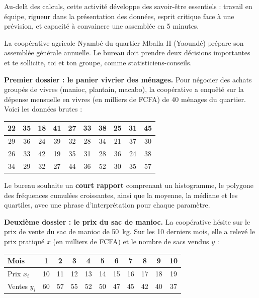 \documentclass[11pt]{article}
\newcounter{popsec}
\newcounter{popsub}
\newcommand{\courssub}[1]{%
  \stepcounter{popsub}%
  \par\vspace{9pt}\noindent{\popxbold\fontsize{11.5}{13}\selectfont\color{popink}{\color{poporange}\thepopsec.\thepopsub}\hspace{6pt}#1}\par\nopagebreak\vspace{4pt}
}
\begin{document}
Au-delà des calculs, cette activité développe des savoir-être essentiels : travail en équipe, rigueur dans la présentation des données, esprit critique face à une prévision, et capacité à convaincre une assemblée en 5 minutes.

\courssub{Situation}

La coopérative agricole \og{}Nyambé\fg{} du quartier Mballa II (Yaoundé) prépare son assemblée générale annuelle. Le bureau doit prendre deux décisions importantes et te sollicite, toi et ton groupe, comme statisticiens-conseils.

\textbf{Premier dossier : le panier vivrier des ménages.} Pour négocier des achats groupés de vivres (manioc, plantain, macabo), la coopérative a enquêté sur la dépense mensuelle en vivres (en milliers de FCFA) de 40 ménages du quartier. Voici les données brutes :

\begin{center}
\begin{tabular}{|c|c|c|c|c|c|c|c|c|c|}
\hline
22 & 35 & 18 & 41 & 27 & 33 & 38 & 25 & 31 & 45 \\
\hline
29 & 36 & 24 & 39 & 32 & 28 & 34 & 21 & 37 & 30 \\
\hline
26 & 33 & 42 & 19 & 35 & 31 & 28 & 36 & 24 & 38 \\
\hline
34 & 29 & 32 & 27 & 44 & 36 & 52 & 30 & 35 & 57 \\
\hline
\end{tabular}
\end{center}

Le bureau souhaite un \textbf{court rapport} comprenant un histogramme, le polygone des fréquences cumulées croissantes, ainsi que la moyenne, la médiane et les quartiles, avec une phrase d'interprétation pour chaque paramètre.

\textbf{Deuxième dossier : le prix du sac de manioc.} La coopérative hésite sur le prix de vente du sac de manioc de \SI{50}{kg}. Sur les 10 derniers mois, elle a relevé le prix pratiqué $x$ (en milliers de FCFA) et le nombre de sacs vendus $y$ :

\begin{center}
\begin{tabular}{|l|c|c|c|c|c|c|c|c|c|c|}
\hline
Mois & 1 & 2 & 3 & 4 & 5 & 6 & 7 & 8 & 9 & 10 \\
\hline
Prix $x_i$ & 10 & 11 & 12 & 13 & 14 & 15 & 16 & 17 & 18 & 19 \\
\hline
Ventes $y_i$ & 60 & 57 & 55 & 52 & 50 & 47 & 45 & 42 & 40 & 37 \\
\hline
\end{tabular}
\end{center}
\end{document}
